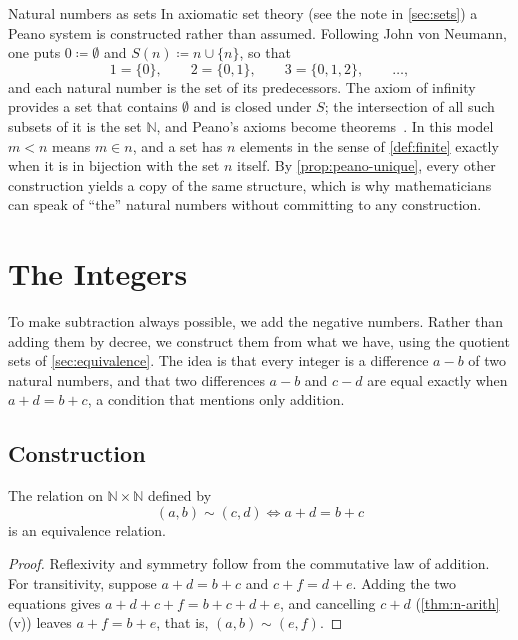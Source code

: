 \begin{note}{Natural numbers as sets}
In axiomatic set theory (see the note in \cref{sec:sets}) a Peano system is constructed rather than assumed. Following John von Neumann, one puts $0\coloneqq\emptyset$ and $S(n)\coloneqq n\cup\{n\}$, so that
\[
1=\{0\},\qquad2=\{0,1\},\qquad3=\{0,1,2\},\qquad\ldots,
\]
and each natural number is the set of its predecessors. The axiom of infinity provides a set that contains $\emptyset$ and is closed under $S$; the intersection of all such subsets of it is the set $\mathbb N$, and Peano's axioms become theorems~\cite{enderton1977sets,hrbacek1999}. In this model $m<n$ means $m\in n$, and a set has $n$ elements in the sense of \cref{def:finite} exactly when it is in bijection with the set $n$ itself. By \cref{prop:peano-unique}, every other construction yields a copy of the same structure, which is why mathematicians can speak of ``the'' natural numbers without committing to any construction.
\end{note}

\section{The Integers}
\label{sec:integers}

To make subtraction always possible, we add the negative numbers. Rather than adding them by decree, we construct them from what we have, using the quotient sets of \cref{sec:equivalence}. The idea is that every integer is a difference $a-b$ of two natural numbers, and that two differences $a-b$ and $c-d$ are equal exactly when $a+d=b+c$, a condition that mentions only addition.

\subsection{Construction}

\begin{lemma}
\label{lem:z-equivalence}
The relation on $\mathbb N\times\mathbb N$ defined by
\[
(a,b)\sim(c,d)\iff a+d=b+c
\]
is an equivalence relation.
\end{lemma}

\begin{proof}
Reflexivity and symmetry follow from the commutative law of addition. For transitivity, suppose $a+d=b+c$ and $c+f=d+e$. Adding the two equations gives $a+d+c+f=b+c+d+e$, and cancelling $c+d$ (\cref{thm:n-arith}\,(v)) leaves $a+f=b+e$, that is, $(a,b)\sim(e,f)$.
\end{proof}

